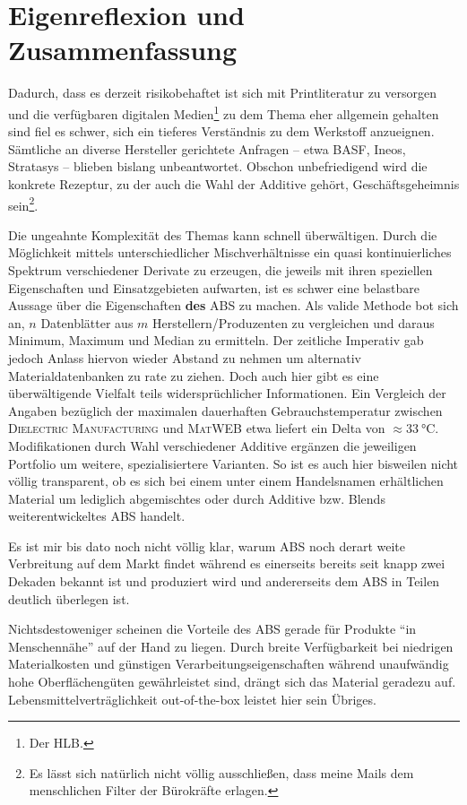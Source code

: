\chapter{Eigenreflexion und Zusammenfassung}
    Dadurch, dass es derzeit risikobehaftet ist sich mit Printliteratur zu versorgen und die verfügbaren digitalen Medien\footnote{Der HLB.}
    zu dem Thema eher allgemein gehalten sind fiel es schwer, sich ein tieferes Verständnis zu dem Werkstoff anzueignen.
    Sämtliche an diverse Hersteller gerichtete Anfragen – etwa BASF, Ineos, Stratasys – blieben bislang unbeantwortet.
    Obschon unbefriedigend wird die konkrete Rezeptur, zu der auch die Wahl der Additive gehört, Geschäftsgeheimnis sein\footnote{Es lässt sich natürlich nicht völlig ausschließen, dass meine Mails dem menschlichen Filter der Bürokräfte erlagen.}.
    
    \medskip
    Die ungeahnte Komplexität des Themas kann schnell überwältigen. Durch die Möglichkeit mittels unterschiedlicher Mischverhältnisse
    ein quasi kontinuierliches Spektrum verschiedener Derivate zu erzeugen, die jeweils mit ihren speziellen Eigenschaften
    und Einsatzgebieten aufwarten, ist es schwer eine belastbare Aussage über die Eigenschaften \textbf{des} ABS zu machen.
    Als valide Methode bot sich an, \(n\) Datenblätter aus \(m\) Herstellern/Produzenten zu vergleichen und daraus Minimum,
    Maximum und Median zu ermitteln. Der zeitliche Imperativ gab jedoch Anlass hiervon wieder Abstand zu nehmen um
    alternativ Materialdatenbanken zu rate zu ziehen. Doch auch hier gibt es eine überwältigende Vielfalt teils widersprüchlicher Informationen.
    Ein Vergleich der Angaben bezüglich der maximalen dauerhaften Gebrauchstemperatur zwischen \textsc{Dielectric Manufacturing}\cite{ABS.Datasheet.dielectricmfg.20190227}
    und \textsc{MatWEB}\cite{materialdatenbank.ABS.matweb.com.20210210} etwa liefert ein Delta von \(\approx \SI{33}{\celsius}\).
    Modifikationen durch Wahl verschiedener Additive ergänzen die jeweiligen Portfolio um weitere, spezialisiertere Varianten.
    So ist es auch hier bisweilen nicht völlig transparent, ob es sich bei einem unter einem Handelsnamen erhältlichen Material
    um lediglich abgemischtes oder durch Additive bzw. Blends weiterentwickeltes ABS handelt.
    
    \medskip
    Es ist mir bis dato noch nicht völlig klar, warum ABS noch derart weite Verbreitung auf dem Markt findet während es
    einerseits bereits seit knapp zwei Dekaden bekannt ist und produziert wird und andererseits dem ABS in Teilen deutlich
    überlegen ist.

    Nichtsdestoweniger scheinen die Vorteile des ABS gerade für Produkte \enquote{in Menschennähe} auf der Hand zu liegen.
    Durch breite Verfügbarkeit bei niedrigen Materialkosten und günstigen Verarbeitungseigenschaften während unaufwändig hohe
    Oberflächengüten gewährleistet sind, drängt sich das Material geradezu auf. Lebensmittelverträglichkeit out-of-the-box
    leistet hier sein Übriges.

    \medskip
    